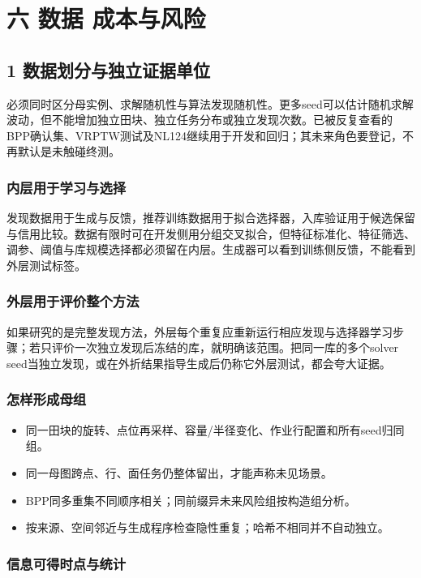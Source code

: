 \documentclass[11pt,a4paper]{article}
\newcommand{\bodytext}[1]{#1\par}
\begin{document}
\section{六 数据 成本与风险}
\subsection{1  数据划分与独立证据单位}
\bodytext{必须同时区分母实例、求解随机性与算法发现随机性。更多seed可以估计随机求解波动，但不能增加独立田块、独立任务分布或独立发现次数。已被反复查看的BPP确认集、VRPTW测试及NL124继续用于开发和回归；其未来角色要登记，不再默认是未触碰终测。}
\subsubsection{内层用于学习与选择}
\bodytext{发现数据用于生成与反馈，推荐训练数据用于拟合选择器，入库验证用于候选保留与信用比较。数据有限时可在开发侧用分组交叉拟合，但特征标准化、特征筛选、调参、阈值与库规模选择都必须留在内层。生成器可以看到训练侧反馈，不能看到外层测试标签。}
\subsubsection{外层用于评价整个方法}
\bodytext{如果研究的是完整发现方法，外层每个重复应重新运行相应发现与选择器学习步骤；若只评价一次独立发现后冻结的库，就明确该范围。把同一库的多个solver seed当独立发现，或在外折结果指导生成后仍称它外层测试，都会夸大证据。}
\subsubsection{怎样形成母组}
\begin{itemize}
\item 同一田块的旋转、点位再采样、容量/\allowbreak{}半径变化、作业行配置和所有seed归同组。
\item 同一母图跨点、行、面任务仍整体留出，才能声称未见场景。
\item BPP同多重集不同顺序相关；同前缀异未来风险组按构造组分析。
\item 按来源、空间邻近与生成程序检查隐性重复；哈希不相同并不自动独立。
\end{itemize}
\subsubsection{信息可得时点与统计}
\end{document}

